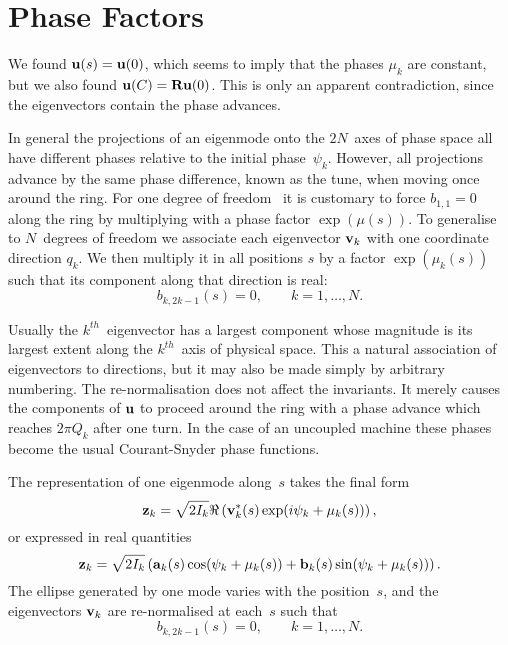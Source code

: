  
\section{Phase Factors}
We found $\bold{u}(s) = \bold{u}(0)$,
which seems to imply that the phases $\mu_k$ are constant,
but we also found $\bold{u}(C) = \bold{R} \bold{u}(0)$.
This is only an apparent contradiction,
since the eigenvectors contain the phase advances.
 
In general the projections of an eigenmode onto the $2N$~axes of
phase space all have different phases relative to the initial
phase~$\psi_k$.
However, all projections advance by the same phase difference,
known as the tune, when moving once around the ring.
For one degree of freedom~\cite{COU58} it is customary to force
$b_{1,1}=0$ along the ring by multiplying with a phase factor
$\exp(\mu(s))$.
To generalise to $N$~degrees of freedom we associate each eigenvector
$\bold{v}_k$ with one coordinate direction $q_k$.
We then multiply it in all positions $s$ by a factor $\exp(\mu_k(s))$
such that its component along that direction is real:
\begin{equation}
b_{k,2k-1}(s) = 0, \qquad k = 1, \ldots , N.
\end{equation}
 
Usually the $k^{th}$~eigenvector has a largest component
whose magnitude is its largest extent along the $k^{th}$~axis of
physical space.
This a natural association of eigenvectors to directions,
but it may also be made simply by arbitrary numbering.
The re-normalisation does not affect the invariants.
It merely causes the components of $\bold{u}$ to proceed around the ring with
a phase advance which reaches $2 \pi Q_k$ after one turn.
In the case of an uncoupled machine these phases become the usual
Courant-Snyder phase functions.
 
The representation of one eigenmode along~$s$ takes the final form
\begin{equation}
\bold{z}_k = \sqrt{2 I_k} \Re \left(
        \bold{v}_k^*(s) \exp (i \psi_k + \mu_k(s))
\right),
\end{equation}
or expressed in real quantities
\begin{equation}
\bold{z}_k = \sqrt{2 I_k} \left(
        \bold{a}_k(s) \cos(\psi_k + \mu_k(s)) +
        \bold{b}_k(s) \sin(\psi_k + \mu_k(s))
\right).
\end{equation}
The ellipse generated by one mode varies with the position~$s$,
and the eigenvectors $\bold{v}_k$ are re-normalised at each~$s$ such that
\begin{equation}
b_{k,2k-1}(s) = 0, \qquad k = 1, \ldots , N.
\end{equation}
 
